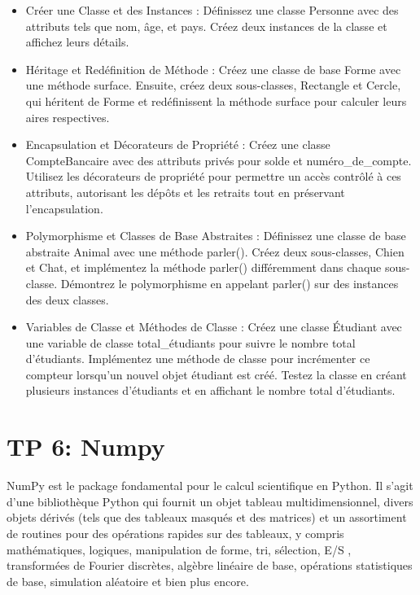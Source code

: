 \documentclass[11pt]{article}
\begin{document}
\begin{itemize}
\item
  Créer une Classe et des Instances : Définissez une classe Personne
  avec des attributs tels que nom, âge, et pays. Créez deux instances de
  la classe et affichez leurs détails.
\item
  Héritage et Redéfinition de Méthode : Créez une classe de base Forme
  avec une méthode surface. Ensuite, créez deux sous-classes, Rectangle
  et Cercle, qui héritent de Forme et redéfinissent la méthode surface
  pour calculer leurs aires respectives.
\item
  Encapsulation et Décorateurs de Propriété : Créez une classe
  CompteBancaire avec des attributs privés pour solde et
  numéro\_de\_compte. Utilisez les décorateurs de propriété pour
  permettre un accès contrôlé à ces attributs, autorisant les dépôts et
  les retraits tout en préservant l'encapsulation.
\item
  Polymorphisme et Classes de Base Abstraites : Définissez une classe de
  base abstraite Animal avec une méthode parler(). Créez deux
  sous-classes, Chien et Chat, et implémentez la méthode parler()
  différemment dans chaque sous-classe. Démontrez le polymorphisme en
  appelant parler() sur des instances des deux classes.
\item
  Variables de Classe et Méthodes de Classe : Créez une classe Étudiant
  avec une variable de classe total\_étudiants pour suivre le nombre
  total d'étudiants. Implémentez une méthode de classe pour incrémenter
  ce compteur lorsqu'un nouvel objet étudiant est créé. Testez la classe
  en créant plusieurs instances d'étudiants et en affichant le nombre
  total d'étudiants.
\end{itemize}

    \hypertarget{tp-6-numpy}{%
\section{TP 6: Numpy}\label{tp-6-numpy}}

NumPy est le package fondamental pour le calcul scientifique en Python.
Il s'agit d'une bibliothèque Python qui fournit un objet tableau
multidimensionnel, divers objets dérivés (tels que des tableaux masqués
et des matrices) et un assortiment de routines pour des opérations
rapides sur des tableaux, y compris mathématiques, logiques,
manipulation de forme, tri, sélection, E/S , transformées de Fourier
discrètes, algèbre linéaire de base, opérations statistiques de base,
simulation aléatoire et bien plus encore.
\end{document}
